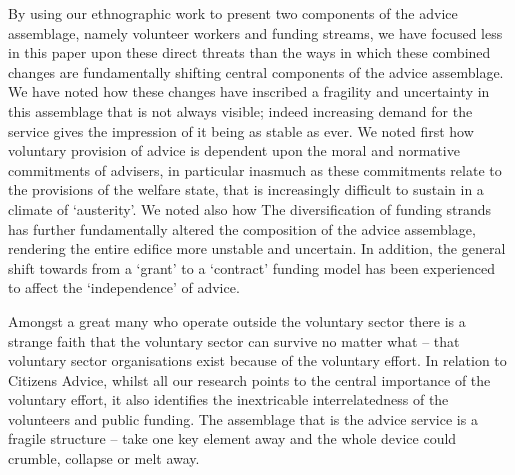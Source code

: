 By using our ethnographic work to present two components of the advice assemblage, namely volunteer workers and funding streams, we have focused less in this paper upon these direct threats than the ways in which these combined changes are fundamentally shifting central components of the advice assemblage. We have noted how these changes have inscribed a fragility and uncertainty in this assemblage that is not always visible; indeed increasing demand for the service gives the impression of it being as stable as ever. We noted first how voluntary provision of advice is dependent upon the moral and normative commitments of advisers, in particular inasmuch as these commitments relate to the provisions of the welfare state, that is increasingly difficult to sustain in a climate of ‘austerity’. We noted also how The diversification of funding strands has further fundamentally altered the composition of the advice assemblage, rendering the entire edifice more unstable and uncertain. In addition, the general shift towards from a ‘grant’ to a ‘contract’ funding model has been experienced to affect the ‘independence’ of advice.
\par
Amongst a great many who operate outside the voluntary sector there is a strange faith that the voluntary sector can survive no matter what – that voluntary sector organisations exist because of the voluntary effort. In relation to Citizens Advice, whilst all our research points to the central importance of the voluntary effort, it also identifies the inextricable interrelatedness of the volunteers and public funding. The assemblage that is the advice service is a fragile structure – take one key element away and the whole device could crumble, collapse or melt away.